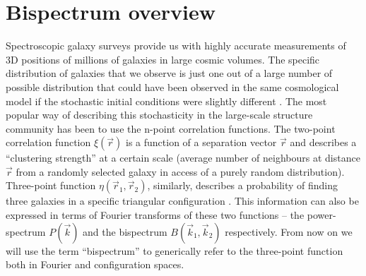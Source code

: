 
\section{Bispectrum overview}

Spectroscopic galaxy surveys provide us with highly accurate measurements of 3D
positions of millions of galaxies in large cosmic volumes.  The specific
distribution of galaxies that we observe is just one out of a large number of
possible distribution that could have been observed in the same cosmological
model if the stochastic initial conditions were slightly different \cite{2008cosm.book.....W}. The most
popular way of describing this stochasticity in the large-scale structure
community has been to use the n-point correlation functions.  The two-point
correlation function $\xi(\vec{r})$ is a function of a separation vector
$\vec{r}$ and describes a ``clustering strength'' at a certain scale (average
number of neighbours at distance $\vec{r}$ from a randomly selected galaxy in
access of a purely random distribution).  Three-point function $\eta(\vec{r}_1,
\vec{r}_2)$, similarly, describes a probability of finding three galaxies  in a
specific triangular configuration \cite{1980lssu.book.....P}.  This information
can also be expressed in
terms of Fourier transforms of these two functions  -- the power-spectrum
$P(\vec{k})$ and the bispectrum $B(\vec{k}_1, \vec{k}_2)$ respectively. From now
on we will use the term ``bispectrum'' to generically refer to the three-point
function both in Fourier and configuration spaces. 

